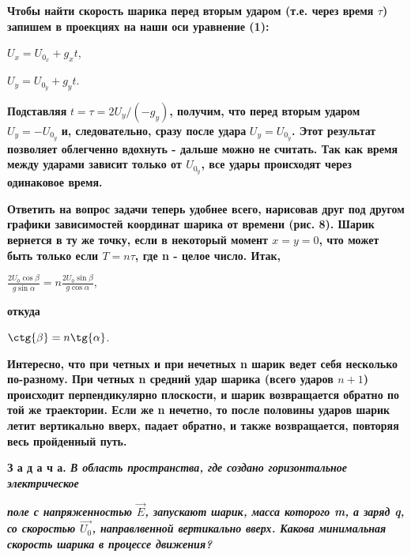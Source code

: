 \begin{multicols}{2}
    
    \noindent\textbf{Чтобы найти скорость шарика перед вторым ударом (т.е. через время $\tau$) запишем в проекциях на наши оси уравнение (1):}
    
    \begin{center}
        \noindent $U_x = U_{0_x} + g_xt$,
    
        \noindent $U_y = U_{0_y} + g_yt$.
    \end{center}
    
    \noindent\textbf{Подставляя} $t=\tau=2U_y/(-g_y)$\textbf{, получим, что перед вторым ударом} $U_y=-U_{0_y}$ \textbf{и, следовательно, сразу после удара} $U_y=U_{0_y}$\textbf{. Этот результат позволяет облегченно вдохнуть - дальше можно не считать. Так как время между ударами зависит только от $U_{0_y}$, все удары происходят через одинаковое время.}
    
    \textbf{Ответить на вопрос задачи теперь удобнее всего, нарисовав друг под другом графики зависимостей координат шарика от времени (рис. 8). Шарик вернется в ту же точку, если в некоторый момент $x=y=0$, что  может быть только если $T=n\tau$, где n - целое число. Итак,}
    
    \begin{center}
        $\frac{2U_0\cos\beta}{g\sin{\alpha}} = n\frac{2U_0\sin\beta}{g\cos{\alpha}}$,     
    \end{center}
    
    \noindent\textbf{откуда}
    
    \begin{center}
        $\ctg{\beta} = n \tg{\alpha}$.
    \end{center}
    
    \textbf{Интересно, что при четных и при нечетных n шарик ведет себя несколько по-разному. При четных n средний удар шарика (всего ударов $n + 1$) происходит перпендикулярно плоскости, и шарик возвращается обратно по той же траектории. Если же n нечетно, то после половины ударов шарик летит вертикально вверх, падает обратно, и также возвращается, повторяя весь пройденный путь.}
    
    \textbf{З а д а ч а. \textit{В область пространства, где создано горизонтальное электрическое}}
    
    \columnbreak
    
    \noindent\textbf{\textit{поле с напряженностью $\vec{E}$, запускают шарик, масса которого m, а заряд q, со скоростью $\vec{U_0}$, направлвенной вертикально вверх. Какова минимальная скорость шарика в процессе движения?}}
    

\end{multicols}
